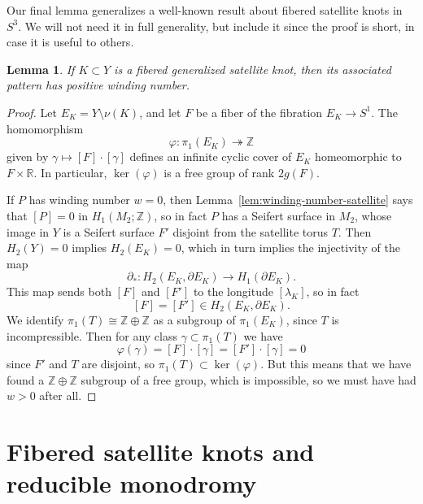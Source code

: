 \documentclass[11pt]{amsart}
\newtheorem {lemma}[theorem]{Lemma}
\numberwithin{equation}{section}
\numberwithin{theorem}{section}
\theoremstyle{definition}
\newcommand{\Z}{\mathbb{Z}}
\newcommand{\R}{\mathbb{R}}
\renewcommand{\phi}{\varphi}
\begin{document}
Our final lemma generalizes a well-known result about  fibered satellite knots in $S^3$. We will not need it in full generality, but  include it  since the proof is short, in case it is useful to others.

\begin{lemma} \label{lem:fibered-satellite}
If $K \subset Y$ is a fibered generalized satellite knot, then its associated pattern  has  positive winding number.
\end{lemma}

\begin{proof}
Let $E_K = Y\setminus \nu(K)$, and let $F$ be a fiber of the fibration $E_K \to S^1$. The homomorphism
\[ \phi: \pi_1(E_K) \twoheadrightarrow \Z \]
given by $\gamma \mapsto [F] \cdot [\gamma]$ defines an infinite cyclic cover of $E_K$ homeomorphic to $F \times \R$.  In particular, $\ker(\phi)$ is a free group of rank $2g(F)$.

If $P$ has winding number $w=0$, then Lemma~\ref{lem:winding-number-satellite} says that $[P] = 0$ in $H_1(M_2;\Z)$, so in fact $P$ has a Seifert surface in $M_2$, whose image in $Y$ is a Seifert surface $F'$ disjoint from the satellite torus $T$.  Then $H_2(Y)=0$ implies $H_2(E_K) = 0$, which in turn implies the injectivity of the map
\[ \partial_*: H_2(E_K, \partial E_K) \to H_1(\partial E_K). \]
This map sends both $[F]$ and $[F']$ to the longitude $[\lambda_K]$, so in fact \[[F] = [F']\in H_2(E_K,\partial E_K).\]
We identify $\pi_1(T) \cong \Z\oplus\Z$ as a subgroup of $\pi_1(E_K)$, since $T$ is incompressible.  Then for any class $\gamma \subset \pi_1(T)$ we have
\[ \phi(\gamma) = [F] \cdot [\gamma] = [F'] \cdot [\gamma] = 0 \]
since $F'$ and $T$ are disjoint, so $\pi_1(T) \subset \ker(\phi)$.  But this means that we have found a $\Z\oplus\Z$ subgroup of a free group, which is impossible, so we must have had $w > 0$ after all.
\end{proof}

%
%
%
%
%

\section{Fibered satellite knots and reducible monodromy} \label{sec:reducing-curves}
\end{document}
